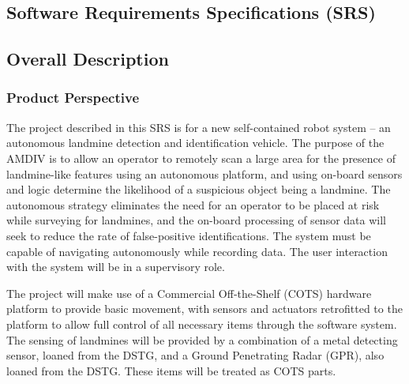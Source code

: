 \documentclass[main.tex]{subfiles}
\begin{document}
\begin{appendices}
\section{Software Requirements Specifications (SRS)}
 
\subsection{Overall Description}
\subsubsection{Product Perspective}
The project described in this SRS is for a new self-contained robot system – an autonomous landmine detection and identification vehicle. 
The purpose of the AMDIV is to allow an operator to remotely scan a large area for the presence of landmine-like features using an autonomous platform, and using on-board sensors and logic determine the likelihood of a suspicious object being a landmine. 
The autonomous strategy eliminates the need for an operator to be placed at risk while surveying for landmines, and the on-board processing of sensor data will seek to reduce the rate of false-positive identifications. 
The system must be capable of navigating autonomously while recording data. The user interaction with the system will be in a supervisory role.

The project will make use of a Commercial Off-the-Shelf (COTS) hardware platform to provide basic movement, with sensors and actuators retrofitted to the platform to allow full control of all necessary items through the software system. 
The sensing of landmines will be provided by a combination of a metal detecting sensor, loaned from the DSTG, and a Ground Penetrating Radar (GPR), also loaned from the DSTG. 
These items will be treated as COTS parts.


\end{appendices}
\end{document}
